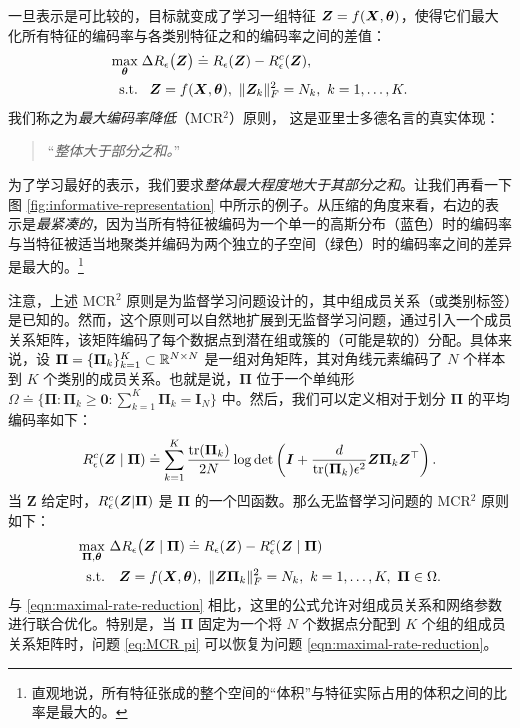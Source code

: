 \documentclass[../../book-main.tex]{subfiles}
\begin{document}
一旦表示是可比较的，目标就变成了学习一组特征 $\bm{Z}  = f(\bm{X}, \bm \theta)$，使得它们最大化所有特征的编码率与各类别特征之和的编码率之间的差值：
\begin{equation}
	\begin{aligned}
		\max_{\bm \theta } & \;  \Delta R_{\epsilon}\big(\Z \big) \doteq R_{\epsilon}(\Z) - R_{\epsilon}^c(\Z ), \\
		\mbox{s.t.} & \ \ \, \Z = f(\bm X, \bm \theta),\  \|\Z_k\|_F^2                                          = N_k,\ k=1,\dots,K. 
	\end{aligned}
	\label{eqn:maximal-rate-reduction}
\end{equation}
我们称之为{\em 最大编码率降低}（MCR$^2$）原则，
这是亚里士多德名言的真实体现：
\begin{quote}
	\centering
	“{\em 整体大于部分之和。}”
\end{quote}
为了学习最好的表示，我们要求{\em 整体最大程度地大于其部分之和}。让我们再看一下图 \ref{fig:informative-representation} 中所示的例子。从压缩的角度来看，右边的表示是{\em 最紧凑的}，因为当所有特征被编码为一个单一的高斯分布（蓝色）时的编码率与当特征被适当地聚类并编码为两个独立的子空间（绿色）时的编码率之间的差异是最大的。\footnote{直观地说，所有特征张成的整个空间的“体积”与特征实际占用的体积之间的比率是最大的。}

 
    注意，上述 MCR$^2$ 原则是为监督学习问题设计的，其中组成员关系（或类别标签）是已知的。然而，这个原则可以自然地扩展到无监督学习问题，通过引入一个成员关系矩阵，该矩阵编码了每个数据点到潜在组或簇的（可能是软的）分配。具体来说，设 $\bm \Pi = \{\bm \Pi_k\}_{k=1}^K \subset \mathbb{R}^{N\times N}$ 是一组对角矩阵，其对角线元素编码了 $N$ 个样本到 $K$ 个类别的成员关系。也就是说，$\bm \Pi$ 位于一个单纯形 $\Omega \doteq \{\bm \Pi: \bm \Pi_k \ge \bm 0: \sum_{k=1}^K \bm \Pi_k = \bm I_N\}$ 中。然后，我们可以定义相对于划分 $\bm \Pi$ 的平均编码率如下：
    \begin{align}\label{eq:MCRc}
        R_{\epsilon}^c(\bm{Z} \mid \bm \Pi) \doteq \sum_{k=1}^K \frac{\mathrm{tr}(\bm \Pi_k)}{2N}\log\det\left(\bm I + \frac{d}{\mathrm{tr}(\bm \Pi_k)\epsilon^2}\bm Z\bm \Pi_k \bm Z^\top \right).
    \end{align}
    当 $\bm Z$ 给定时，$R_{\epsilon}^c(\bm{Z} \vert \bm \Pi)$ 是 $\bm \Pi$ 的一个凹函数。那么无监督学习问题的 MCR$^2$ 原则如下：
    \begin{align}\label{eq:MCR pi}
        \max_{\bm \Pi, \bm \theta} & \  \Delta R_{\epsilon}\big(\bm{Z}  \mid \bm \Pi) \doteq R_{\epsilon}(\bm Z) - R_{\epsilon}^c(\bm{Z} \mid \bm \Pi) \notag \\ 
       \mathrm{s.t.}  & \ \ \ \bm Z = f(\bm X, \bm \theta),\ \|\bm Z \bm \Pi_k\|_F^2 = N_k,\ k = 1,\dots,K,\ \bm\Pi \in \Omega. 
    \end{align}
    与 \eqref{eqn:maximal-rate-reduction} 相比，这里的公式允许对组成员关系和网络参数进行联合优化。特别是，当 $\bm \Pi$ 固定为一个将 $N$ 个数据点分配到 $K$ 个组的组成员关系矩阵时，问题 \eqref{eq:MCR pi} 可以恢复为问题 \eqref{eqn:maximal-rate-reduction}。
 
\end{document}

